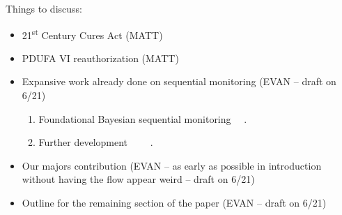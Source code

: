 \documentclass[12pt]{article}
\begin{document}
Things to discuss:
\begin{itemize}
 \item 21\textsuperscript{st} Century Cures Act (MATT)
 \item PDUFA VI reauthorization (MATT)
 \item Expansive work already done on sequential monitoring  (EVAN -- draft on 6/21)
\begin{enumerate}
\item Foundational Bayesian sequential monitoring \cite{Cornfield1966}~\cite{Cornfield1966a}~\cite{Neyman1967}.
\item Further development \cite{Freedman1989}~\cite{Freedman1992}~\cite{Spiegelhalter1993}~\cite{Spiegelhalter1994}~\cite{Fayers1997}.
\end{enumerate}
 \item Our majors contribution (EVAN -- as early as possible in introduction without having the flow appear weird -- draft on 6/21)
 \item Outline for the remaining section of the paper (EVAN -- draft on 6/21)
\end{itemize}
\end{document}
